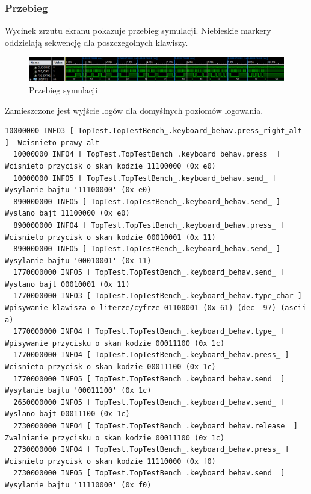 \documentclass[a4paper,12pt]{article}
\begin{document}
\subsubsection{Przebieg}


Wycinek zrzutu ekranu pokazuje przebieg symulacji. Niebieskie markery oddzielają sekwencję dla poszczegolnych klawiszy.
\begin{figure}[htb]
   \centering
   \includegraphics[width=15cm]{grafika/keyboard_sim.png}
   \caption{Przebieg symulacji}
\end{figure}


Zamieszczone jest wyjście logów dla domyślnych poziomów logowania.
\begin{lstlisting}[label=Keyboard_output,caption=Keyboard logs output]
  10000000 INFO3 [ TopTest.TopTestBench_.keyboard_behav.press_right_alt ]  Wcisnieto prawy alt
  10000000 INFO4 [ TopTest.TopTestBench_.keyboard_behav.press_ ]  Wcisnieto przycisk o skan kodzie 11100000 (0x e0)
  10000000 INFO5 [ TopTest.TopTestBench_.keyboard_behav.send_ ]  Wysylanie bajtu '11100000' (0x e0)
  890000000 INFO5 [ TopTest.TopTestBench_.keyboard_behav.send_ ]  Wyslano bajt 11100000 (0x e0)
  890000000 INFO4 [ TopTest.TopTestBench_.keyboard_behav.press_ ]  Wcisnieto przycisk o skan kodzie 00010001 (0x 11)
  890000000 INFO5 [ TopTest.TopTestBench_.keyboard_behav.send_ ]  Wysylanie bajtu '00010001' (0x 11)
  1770000000 INFO5 [ TopTest.TopTestBench_.keyboard_behav.send_ ]  Wyslano bajt 00010001 (0x 11)
  1770000000 INFO3 [ TopTest.TopTestBench_.keyboard_behav.type_char ]  Wpisywanie klawisza o literze/cyfrze 01100001 (0x 61) (dec  97) (ascii a)
  1770000000 INFO4 [ TopTest.TopTestBench_.keyboard_behav.type_ ]  Wpisywanie przycisku o skan kodzie 00011100 (0x 1c)
  1770000000 INFO4 [ TopTest.TopTestBench_.keyboard_behav.press_ ]  Wcisnieto przycisk o skan kodzie 00011100 (0x 1c)
  1770000000 INFO5 [ TopTest.TopTestBench_.keyboard_behav.send_ ]  Wysylanie bajtu '00011100' (0x 1c)
  2650000000 INFO5 [ TopTest.TopTestBench_.keyboard_behav.send_ ]  Wyslano bajt 00011100 (0x 1c)
  2730000000 INFO4 [ TopTest.TopTestBench_.keyboard_behav.release_ ]  Zwalnianie przycisku o skan kodzie 00011100 (0x 1c)
  2730000000 INFO4 [ TopTest.TopTestBench_.keyboard_behav.press_ ]  Wcisnieto przycisk o skan kodzie 11110000 (0x f0)
  2730000000 INFO5 [ TopTest.TopTestBench_.keyboard_behav.send_ ]  Wysylanie bajtu '11110000' (0x f0)

\end{lstlisting}
\end{document}
